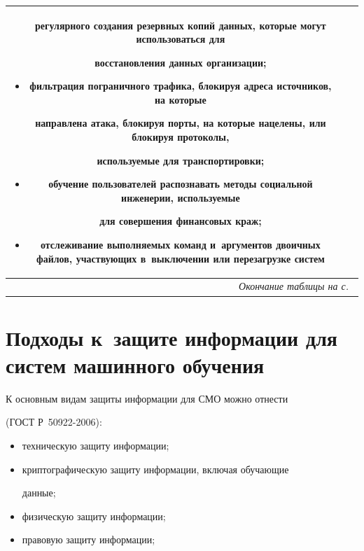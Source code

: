 \begin{table}
\begin{center}
\begin{tabular}{|c|p{58mm}|p{58mm}|}
\begin{itemize}
регулярного создания резервных копий данных, которые могут использоваться для 

восстановления данных организации;

\item фильтрация пограничного трафика, блокируя адреса источников, на которые 

направлена атака, блокируя порты, на которые нацелены, или блокируя протоколы, 

используемые для транспортировки;

\item обучение пользователей распознавать методы социальной инженерии, используемые 

для совершения финансовых краж;

\item отслеживание выполняемых команд и~аргументов двоичных файлов, участвующих в~выключении или перезагрузке систем\vspace*{-6pt}

\end{itemize}\\

\hline

\multicolumn{3}{r}{\textit{Окончание таблицы на с.}~\pageref{s5}}

\end{tabular}

\end{center}

\end{table}










\section{Подходы к~защите информации для систем машинного обучения}

     

     К основным видам защиты информации для СМО можно отнести 

(ГОСТ Р~50922-2006):

     \begin{itemize}

\item техническую защиту информации;

\item криптографическую защиту информации, включая обуча\-ющие 

данные;

\item физическую защиту информации; 

\item правовую защиту информации;

\end{itemize}



